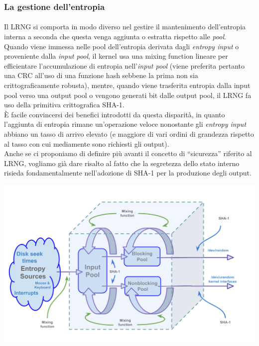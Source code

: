 \documentclass{article}
\begin{document}
 \subsubsection{La gestione dell'entropia}\label{aggiuntaentropia}
 \paragraph{}Il LRNG si comporta in modo diverso nel gestire
 il mantenimento dell'entropia interna a seconda che questa venga
 aggiunta o estratta rispetto alle \emph{pool}. \\
 Quando viene immessa nelle pool dell'entropia derivata dagli
 \emph{entropy input} o proveniente dalla \emph{input pool}, 
 il kernel usa una mixing function lineare per efficientare
 l'accumulazione di entropia nell'\emph{input pool} (viene preferita
 pertanto una CRC all'uso di una funzione hash sebbene la prima non sia
 crittograficamente robusta), mentre, quando viene trasferita entropia
 dalla input pool verso una output pool o vengono generati bit dalle output
 pool, il LRNG fa uso della primitiva crittografica SHA-1. \\
 È facile convincersi dei benefici introdotti da questa disparità, in quanto
 l'aggiunta di entropia rimane un'operazione veloce nonostante gli
 \emph{entropy input} abbiano un tasso di arrivo elevato (e maggiore di vari
 ordini di grandezza rispetto al tasso con cui mediamente sono richiesti gli
 output).\\
 Anche se ci proponiamo di definire più avanti il concetto di ``sicurezza''
 riferito al LRNG, vogliamo già dare risalto al fatto che la segretezza
 dello stato interno risieda fondamentalmente nell'adozione di SHA-1 per la
 produzione degli output.
 
   \centerline{\includegraphics[width=150mm]{img/Sha1.png}}
 
\end{document}
